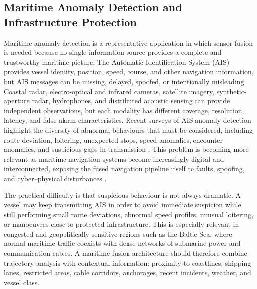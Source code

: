 \documentclass{ieeeaccess}
\begin{document}
\subsection{Maritime Anomaly Detection and Infrastructure Protection}

Maritime anomaly detection is a representative application in which sensor fusion is needed because no single information source provides a complete and trustworthy maritime picture. The Automatic Identification System (AIS) provides vessel identity, position, speed, course, and other navigation information, but AIS messages can be missing, delayed, spoofed, or intentionally misleading. Coastal radar, electro-optical and infrared cameras, satellite imagery, synthetic-aperture radar, hydrophones, and distributed acoustic sensing can provide independent observations, but each modality has different coverage, resolution, latency, and false-alarm characteristics. Recent surveys of AIS anomaly detection highlight the diversity of abnormal behaviours that must be considered, including route deviation, loitering, unexpected stops, speed anomalies, encounter anomalies, and suspicious gaps in transmission \cite{wolsing_anomaly_2022}. This problem is becoming more relevant as maritime navigation systems become increasingly digital and interconnected, exposing the fused navigation pipeline itself to faults, spoofing, and cyber--physical disturbances \cite{oliva_innovation_2026}.

The practical difficulty is that suspicious behaviour is not always dramatic. A vessel may keep transmitting AIS in order to avoid immediate suspicion while still performing small route deviations, abnormal speed profiles, unusual loitering, or manoeuvres close to protected infrastructure. This is especially relevant in congested and geopolitically sensitive regions such as the Baltic Sea, where normal maritime traffic coexists with dense networks of submarine power and communication cables. A maritime fusion architecture should therefore combine trajectory analysis with contextual information: proximity to coastlines, shipping lanes, restricted areas, cable corridors, anchorages, recent incidents, weather, and vessel class.
\end{document}
